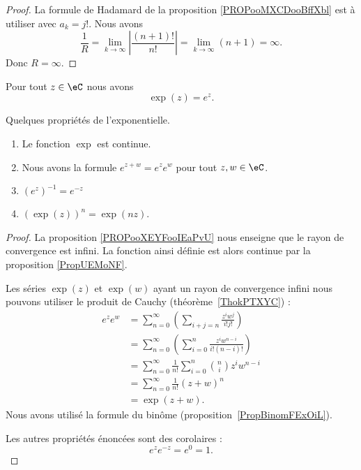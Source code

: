 \begin{proof}
    La formule de Hadamard de la proposition \ref{PROPooMXCDooBffXbl} est à utiliser avec \( a_k=j!\). Nous avons
    \begin{equation}
        \frac{1}{ R }=\lim_{k\to \infty} \left| \frac{ (n+1)! }{ n! } \right| =\lim_{k\to \infty} (n+1)=\infty.
    \end{equation}
    Donc \( R=\infty\).
\end{proof}

\begin{proposition}     \label{PROPooWSDKooJREQGk}
    Pour tout \( z\in \eC\) nous avons
    \begin{equation}
        \exp(z)= e^{z}.
    \end{equation}
\end{proposition}

\begin{proposition}     \label{PropdDjisy}
    Quelques propriétés de l'exponentielle.
    \begin{enumerate}
        \item
            Le fonction \( \exp\) est continue.
        \item       \label{ITEMooRLHCooJTuYKV}
            Nous avons la formule \(  e^{z+w}= e^{z}e^w\) pour tout \( z,w\in \eC\).
        \item
            \( (e^z)^{-1}= e^{-z}\)
        \item       \label{ITEMooIFYFooUniuKS}
            \( (\exp(z))^n=\exp(nz)\).
    \end{enumerate}
\end{proposition}

\begin{proof}
    La proposition \ref{PROPooXEYFooIEaPvU} nous enseigne que le rayon de convergence est infini. La fonction ainsi définie est alors continue par la proposition \ref{PropUEMoNF}.

    Les séries \( \exp(z)\) et \( \exp(w)\) ayant un rayon de convergence infini nous pouvons utiliser le produit de Cauchy (théorème~\ref{ThokPTXYC}) :
    \begin{subequations}
        \begin{align}
            e^{z} e^{w}&=\sum_{n=0}^{\infty}\left( \sum_{i+j=n}\frac{ z^iw^j }{ i!j! } \right)\\
            &=\sum_{n=0}^{\infty}\left( \sum_{i=0}^n\frac{ z^iw^{n-i} }{ i!(n-i)! } \right)\\
            &=\sum_{n=0}^{\infty}\frac{1}{ n! }\sum_{i=0}^{n}{n\choose i}z^iw^{n-i}\\
            &=\sum_{n=0}^{\infty}\frac{1}{ n! }(z+w)^{n}\\
            &=\exp(z+w).
        \end{align}
    \end{subequations}
    Nous avons utilisé la formule du binôme (proposition~\ref{PropBinomFExOiL}).

    Les autres propriétés énoncées sont des corolaires :
    \begin{equation}
        e^{z} e^{-z}= e^{0}=1.
    \end{equation}
\end{proof}

